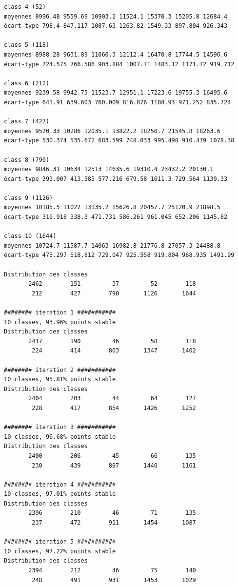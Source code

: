 \documentclass[earth,article,accept,pdftex,moreauthors]{Definitions/mdpi}
\begin{document}
{\begin{scriptsize}
\begin{verbatim}
class 4 (52)
moyennes 8996.48 9559.69 10903.2 11524.1 15370.3 15205.8 12684.4
écart-type 798.4 847.117 1087.63 1263.82 1549.33 897.804 926.343

class 5 (118)
moyennes 8988.28 9631.89 11060.3 12112.4 16470.8 17744.5 14596.6
écart-type 724.575 766.586 903.884 1007.71 1483.12 1171.72 919.712

class 6 (212)
moyennes 9239.58 9942.75 11523.7 12951.1 17223.6 19755.3 16495.6
écart-type 641.91 639.603 760.009 816.876 1108.93 971.252 835.724

class 7 (427)
moyennes 9520.33 10286 12035.1 13822.2 18250.7 21545.8 18263.6
écart-type 530.374 535.672 683.599 748.033 995.498 910.479 1078.38

class 8 (790)
moyennes 9846.31 10634 12513 14635.6 19310.4 23432.2 20130.1
écart-type 393.007 413.585 577.216 679.58 1011.3 729.564 1139.33

class 9 (1126)
moyennes 10185.5 11022 13135.2 15626.8 20457.7 25120.9 21898.5
écart-type 319.918 338.3 471.731 586.261 961.045 652.206 1145.82

class 10 (1644)
moyennes 10724.7 11587.7 14063 16982.8 21776.8 27057.3 24488.8
écart-type 475.297 518.812 729.047 925.558 919.804 968.935 1491.99

Distribution des classes
       2462        151         37         52        118
        212        427        790       1126       1644

######## iteration 1 ###########
10 classes, 93.96% points stable
Distribution des classes
       2417        190         46         58        118
        224        414        803       1347       1402

######## iteration 2 ###########
10 classes, 95.81% points stable
Distribution des classes
       2404        203         44         64        127
        228        417        854       1426       1252

######## iteration 3 ###########
10 classes, 96.68% points stable
Distribution des classes
       2400        206         45         66        135
        230        439        897       1440       1161

######## iteration 4 ###########
10 classes, 97.01% points stable
Distribution des classes
       2396        210         46         71        135
        237        472        911       1454       1087

######## iteration 5 ###########
10 classes, 97.22% points stable
Distribution des classes
       2394        212         46         75        140
        248        491        931       1453       1029


\end{verbatim}
\end{scriptsize}}
\end{document}
